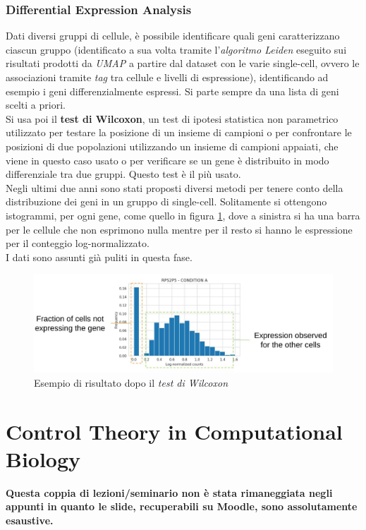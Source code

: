 \documentclass[a4paper,12pt, oneside]{book}
\begin{document}
\subsection{Differential Expression Analysis}
Dati diversi gruppi di cellule, è possibile identificare quali geni
caratterizzano ciascun gruppo (identificato a sua volta tramite
l'\textit{algoritmo Leiden} eseguito sui risultati prodotti da \textit{UMAP} a
partire dal dataset con le varie single-cell, ovvero le associazioni tramite
\textit{tag} tra cellule e livelli di espressione), identificando ad esempio i
geni differenzialmente espressi. Si parte sempre da una lista di geni scelti a
priori.\\
Si usa poi il \textbf{test di Wilcoxon}, un test di ipotesi statistica non
parametrico utilizzato per testare la posizione di un insieme di campioni o per
confrontare le posizioni di due popolazioni utilizzando un insieme di campioni
appaiati, che viene in questo caso usato o per verificare se
un gene è distribuito in modo differenziale tra due gruppi. Questo test è il più
usato.\\
Negli ultimi due anni sono stati proposti diversi metodi per tenere conto della
distribuzione dei geni in un gruppo di single-cell. Solitamente si ottengono
istogrammi, per ogni gene, come quello in figura \ref{fig:wilco}, dove a
sinistra si ha una barra per le cellule che non esprimono nulla mentre per il 
resto si hanno le espressione per il conteggio log-normalizzato. \\
I dati sono assunti già puliti in questa fase.
\begin{figure}
  \centering
  \includegraphics[scale = 0.25]{img/wilco.jpg}
  \caption{Esempio di risultato dopo il \textit{test di Wilcoxon}}
  \label{fig:wilco}
\end{figure}
\chapter{Control Theory in Computational Biology}
\textbf{Questa coppia di lezioni/seminario non è stata rimaneggiata negli
  appunti in quanto le slide, recuperabili su Moodle, sono assolutamente
  esaustive.} 
\end{document}
